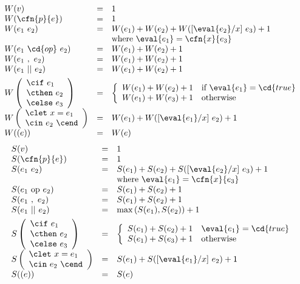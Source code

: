 \begin{cluster}
\begin{definition}
\[
\begin{array}{lcl}
W(v) & = & 1 
\\
W(\cfn{p}{e})  & = & 1 
\\
  W(e_1~e_2) & =  & W(e_1) + W(e_2) + W([\eval{e_2}/x]~e_3) + 1 
\\
          &    & \mbox{where}~\eval{e_1} = \cfn{x}{e_3}
\\
W(e_1~\cd{op}~e_2) & = &  W(e_1) + W(e_2) + 1
\\
W(e_1~,~e_2) & = & W(e_1) + W(e_2) + 1
\\
W(e_1~||~e_2) &=& W(e_1) + W(e_2) + 1
\\[1ex]
W\left(
\begin{array}{l}
\cif~e_1
\\
\cthen~e_2
\\
\celse~e_3
\end{array}
\right)  
& = & 
\left\{
\begin{array}{ll}
W(e_1) + W(e_2) + 1 & \mbox{if}~\eval{e_1} = \cd{true}
\\
W(e_1) + W(e_3) + 1 & \mbox{otherwise}
\end{array}\right.
\\[1ex]
W\left(
\begin{array}{l}
\clet~x=e_1~
\\
\cin~e_2~\cend
\end{array}
\right) 
& = & W(e_1) + W([\eval{e_1}/x]~e_2) + 1
\\[1ex]
W( ( e ) ) & = & W(e)
\end{array}
\]
\medskip
\[
\begin{array}{lcl}
S(v) & = & 1 
\\
S(\cfn{p}{e})  & = & 1 
\\
S(e_1~e_2) & =  & S(e_1) + S(e_2) + S([\eval{e_2}/x]~e_3) + 1 
\\
          &    & \mbox{where}~\eval{e_1} = \cfn{x}{e_3}
\\
S(e_1~\mbox{op}~e_2) & = &  S(e_1) + S(e_2) + 1
\\
S(e_1~,~e_2) & = & S(e_1) + S(e_2) + 1
\\
S(e_1~||~e_2) &=& \max{}{(S(e_1),S(e_2))} + 1
\\[1ex]
S\left(
\begin{array}{l}
\cif~e_1
\\
\cthen~e_2
\\
\celse~e_3
\end{array}
\right)
& = & 
\left\{
\begin{array}{ll}
S(e_1) + S(e_2) + 1 & \eval{e_1} = \cd{true}\\
S(e_1) + S(e_3) + 1 & \mbox{otherwise}
\end{array}\right.
\\[1ex]
S\left(
\begin{array}{l}
\clet~x=e_1~
\\
\cin~e_2~\cend
\end{array}
\right) 
& = & S(e_1) + S([\eval{e_1}/x]~e_2) + 1
\\[1ex]
S( ( e ) ) & = & S(e)
\\
\end{array}
\]


\end{definition}
\end{cluster}
